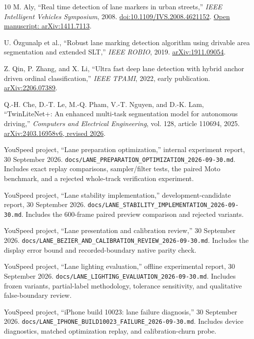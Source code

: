 \documentclass[11pt,a4paper]{article}
\newcommand{\doc}[1]{\nolinkurl{docs/#1}}
\begin{document}
\newpage
\begin{thebibliography}{10}
\small
\setlength{\itemsep}{7pt}
M. Aly, ``Real time detection of lane markers in urban streets,''
\textit{IEEE Intelligent Vehicles Symposium}, 2008.
\href{https://doi.org/10.1109/IVS.2008.4621152}{doi:10.1109/IVS.2008.4621152}.
\href{https://arxiv.org/abs/1411.7113}{Open manuscript: arXiv:1411.7113}.

U. \"Ozgunalp et al., ``Robust lane marking detection algorithm using drivable
area segmentation and extended SLT,'' \textit{IEEE ROBIO}, 2019.
\href{https://arxiv.org/abs/1911.09054}{arXiv:1911.09054}.

Z. Qin, P. Zhang, and X. Li, ``Ultra fast deep lane detection with hybrid anchor
driven ordinal classification,'' \textit{IEEE TPAMI}, 2022, early publication.
\href{https://arxiv.org/abs/2206.07389}{arXiv:2206.07389}.

Q.-H. Che, D.-T. Le, M.-Q. Pham, V.-T. Nguyen, and D.-K. Lam,
``TwinLiteNet+: An enhanced multi-task segmentation model for autonomous driving,''
\textit{Computers and Electrical Engineering}, vol. 128, article 110694, 2025.
\href{https://arxiv.org/abs/2403.16958v6}{arXiv:2403.16958v6, revised 2026}.

YouSpeed project, ``Lane preparation optimization,'' internal experiment report,
30 September 2026. \doc{LANE_PREPARATION_OPTIMIZATION_2026-09-30.md}.
Includes exact replay comparisons, sampler/filter tests, the paired Moto
benchmark, and a rejected whole-track verification experiment.

YouSpeed project, ``Lane stability implementation,'' development-candidate report,
30 September 2026. \doc{LANE_STABILITY_IMPLEMENTATION_2026-09-30.md}.
Includes the 600-frame paired preview comparison and rejected variants.

YouSpeed project, ``Lane presentation and calibration review,''
30 September 2026. \doc{LANE_BEZIER_AND_CALIBRATION_REVIEW_2026-09-30.md}.
Includes the display error bound and recorded-boundary native parity check.

YouSpeed project, ``Lane lighting evaluation,'' offline experimental report,
30 September 2026. \doc{LANE_LIGHTING_EVALUATION_2026-09-30.md}.
Includes frozen variants, partial-label methodology, tolerance sensitivity,
and qualitative false-boundary review.

YouSpeed project, ``iPhone build 10023: lane failure diagnosis,''
30 September 2026. \doc{LANE_IPHONE_BUILD10023_FAILURE_2026-09-30.md}.
Includes device diagnostics, matched optimization replay, and calibration-churn probe.
\end{thebibliography}
\end{document}
